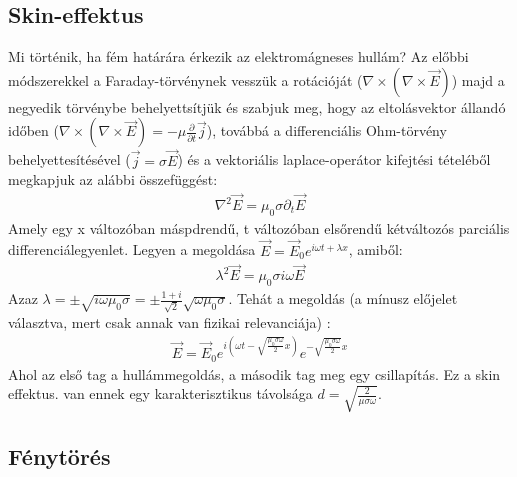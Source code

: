 \documentclass{article}
\begin{document}
\subsection{Skin-effektus} 
Mi történik, ha fém határára érkezik az elektromágneses hullám? Az előbbi módszerekkel a Faraday-törvénynek vesszük a rotációját ($\nabla \times (\nabla \times \vec{E})$) majd a negyedik törvénybe behelyettsítjük és szabjuk meg, hogy az eltolásvektor állandó időben ($\nabla \times (\nabla \times \vec {E}) = -\mu \frac{\partial}{\partial t} \vec{j}$), továbbá a differenciális Ohm-törvény behelyettesítésével ($\vec{j} = \sigma \vec{E}$) és a vektoriális laplace-operátor kifejtési tételéből megkapjuk az alábbi összefüggést:
\begin{gather*}
\nabla^2 \vec{E} = \mu_0 \sigma \partial_t \vec{E}
\end{gather*} 
Amely egy x változóban máspdrendű, t változóban elsőrendű kétváltozós parciális differenciálegyenlet. Legyen a  megoldása $\vec{E} = \vec{E}_0 e^{i\omega t + \lambda x}$, amiből:
\begin{gather*}
\lambda^2 \vec{E} = \mu_0 \sigma i \omega \vec{E}
\end{gather*}
Azaz $\lambda = \pm \sqrt{i\omega \mu_0 \sigma} = \pm\frac{1+i}{\sqrt{2}}\sqrt{\omega \mu_0 \sigma}$. Tehát a megoldás (a mínusz előjelet választva, mert csak annak van fizikai relevanciája) :
\begin{gather*}
\vec{E} = \vec{E}_0 e^{i \left( \omega t - \sqrt{\frac{\mu_0 \sigma \omega}{2}} x  \right)} e^{-\sqrt{\frac{\mu_0 \sigma \omega}{2}} x}
\end{gather*}
Ahol az első tag a hullámmegoldás, a második tag meg egy csillapítás. Ez a skin effektus. van ennek egy karakterisztikus távolsága $d=\sqrt{\frac{2}{\mu \sigma \omega}}$. 
\subsection{Fénytörés}
\end{document}
